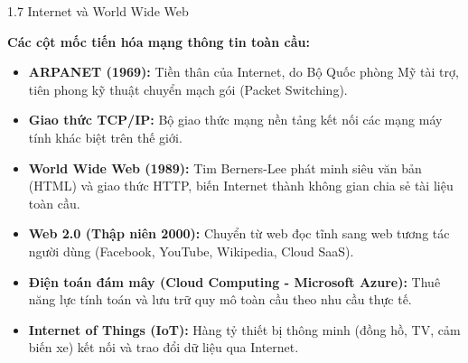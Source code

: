\documentclass[aspectratio=169, 10pt]{beamer}
\begin{document}
\begin{frame}{1.7 Internet và World Wide Web}
  \begin{block}{\textbf{Các cột mốc tiến hóa mạng thông tin toàn cầu:}}
    \begin{itemize}
      \item \textbf{ARPANET (1969):} Tiền thân của Internet, do Bộ Quốc phòng Mỹ tài trợ, tiên phong kỹ thuật chuyển mạch gói (Packet Switching).
      \item \textbf{Giao thức TCP/IP:} Bộ giao thức mạng nền tảng kết nối các mạng máy tính khác biệt trên thế giới.
      \item \textbf{World Wide Web (1989):} Tim Berners-Lee phát minh siêu văn bản (HTML) và giao thức HTTP, biến Internet thành không gian chia sẻ tài liệu toàn cầu.
      \item \textbf{Web 2.0 (Thập niên 2000):} Chuyển từ web đọc tĩnh sang web tương tác người dùng (Facebook, YouTube, Wikipedia, Cloud SaaS).
      \item \textbf{Điện toán đám mây (Cloud Computing - Microsoft Azure):} Thuê năng lực tính toán và lưu trữ quy mô toàn cầu theo nhu cầu thực tế.
      \item \textbf{Internet of Things (IoT):} Hàng tỷ thiết bị thông minh (đồng hồ, TV, cảm biến xe) kết nối và trao đổi dữ liệu qua Internet.
    \end{itemize}
  \end{block}
\end{frame}
\end{document}
